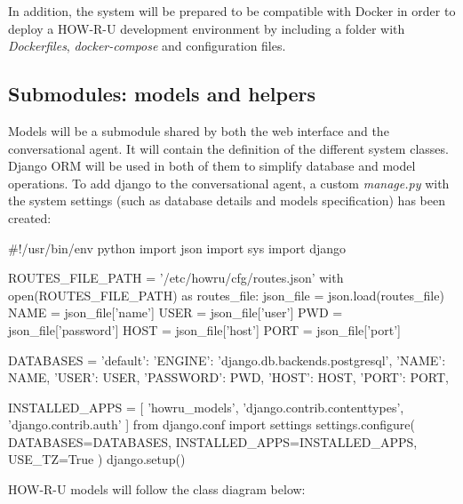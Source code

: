 \documentclass[12pt,english]{article}
\begin{document}
In addition, the system will be prepared to be compatible with Docker in order to deploy a HOW-R-U development environment by including a folder with \emph{Dockerfiles}, \emph{docker-compose} and configuration files.
\newpage
\subsection{Submodules: models and helpers}

Models will be a submodule shared by both the web interface and the conversational agent. It will contain the definition of the different system classes. Django ORM will be used in both of them to simplify database and model operations. To add django to the conversational agent, a custom \emph{manage.py} with the system settings (such as database details and models specification) has been created:

  \begin{python}[caption={Custom \emph{manage.py} file to use Django ORM in the agent. Based in \href{https://stackoverflow.com/questions/45595750/use-django-orm-outside-of-django}{https://stackoverflow.com/questions/45595750/use-django-orm-outside-of-django}}, captionpos=b]
  #!/usr/bin/env python
  import json
  import sys
  import django

  ROUTES_FILE_PATH = '/etc/howru/cfg/routes.json'
  with open(ROUTES_FILE_PATH) as routes_file:
    json_file = json.load(routes_file)
    NAME = json_file['name']
    USER = json_file['user']
    PWD = json_file['password']
    HOST = json_file['host']
    PORT = json_file['port']

  DATABASES = {
    'default': {
        'ENGINE': 'django.db.backends.postgresql',
        'NAME': NAME,
        'USER': USER,
        'PASSWORD': PWD,
        'HOST': HOST,
        'PORT': PORT,
    }
  }

  INSTALLED_APPS = [
    'howru_models',
    'django.contrib.contenttypes',
    'django.contrib.auth'
  ]
  from django.conf import settings
  settings.configure(
    DATABASES=DATABASES,
    INSTALLED_APPS=INSTALLED_APPS,
    USE_TZ=True
  )
  django.setup()

  \end{python}

HOW-R-U models will follow the class diagram below:
\end{document}
